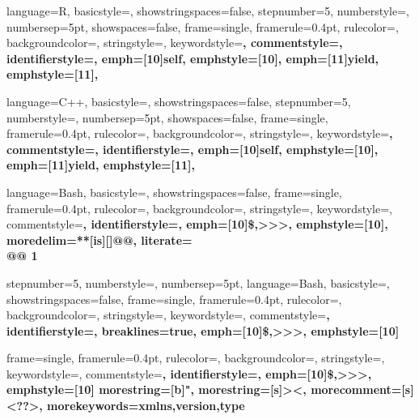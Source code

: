 {
  language=R,
  basicstyle=\small,
  showstringspaces=false,
  stepnumber=5,
  numberstyle=\tiny,
  numbersep=5pt,
  showspaces=false,
  frame=single,
  framerule=0.4pt,
  rulecolor=\color{pgrey},
  backgroundcolor=\color{white},
  stringstyle=\color{BrickRed},
  keywordstyle=\color{BlueViolet}\bfseries,
  commentstyle=\color{PineGreen}\bfseries,
  identifierstyle={},
  emph={[10]self}, emphstyle={[10]\color{pblue}},
  emph={[11]yield}, emphstyle={[11]\color{pblue}},
}

{
  language=C++,
  basicstyle=\small,
  showstringspaces=false,
  stepnumber=5,
  numberstyle=\tiny,
  numbersep=5pt,
  showspaces=false,
  frame=single,
  framerule=0.4pt,
  rulecolor=\color{pgrey},
  backgroundcolor=\color{white},
  stringstyle=\color{BrickRed},
  keywordstyle=\color{BlueViolet}\bfseries,
  commentstyle=\color{PineGreen}\bfseries,
  identifierstyle={},
  emph={[10]self}, emphstyle={[10]\color{pblue}},
  emph={[11]yield}, emphstyle={[11]\color{pblue}},
}

\newcommand{\CC}{C\nolinebreak\hspace{-.05em}\raisebox{1ex}{\tiny\bf +}\nolinebreak\hspace{-.10em}\raisebox{1ex}{\tiny\bf +}}

{
  language=Bash,
  basicstyle=\ttfamily\small,
  showstringspaces=false,
  frame=single,
  framerule=0.4pt,
  rulecolor=\color{pgrey},
  backgroundcolor=\color{plightgrey2},
  stringstyle=\color{BrickRed},
  keywordstyle=\color{BlueViolet},
  commentstyle=\color{PineGreen}\bfseries,
  identifierstyle=\color{black},
  emph={[10]\$,>>>}, emphstyle={[10]\color{pblue}},
  moredelim=**[is][\bfseries\color{red}]{@}{@},
  literate={\\@}{{\makeatletter @ \makeatother}}1
}

{ 
  stepnumber=5,
  numberstyle=\tiny,
  numbersep=5pt,
  language=Bash,
  basicstyle=\ttfamily\small,
  showstringspaces=false,
  frame=single,
  framerule=0.4pt,
  rulecolor=\color{pgrey},
  backgroundcolor=\color{plightgrey2},
  stringstyle=\color{black},
  keywordstyle=\color{black},
  commentstyle=\color{blue}\bfseries,
  identifierstyle=\color{black},
  breaklines=true,
  emph={[10]\$,>>>}, emphstyle={[10]\color{pblue}}
}

{
  frame=single,
  framerule=0.4pt,
  rulecolor=\color{pgrey},
  backgroundcolor=\color{plightgrey2},
  stringstyle=\color{black},
  keywordstyle=\color{black},
  commentstyle=\color{blue}\bfseries,
  identifierstyle=\color{black},
  emph={[10]\$,>>>}, emphstyle={[10]\color{pblue}}
  morestring=[b]",
  morestring=[s]{>}{<},
  morecomment=[s]{<?}{?>},
  morekeywords={xmlns,version,type}%
}


